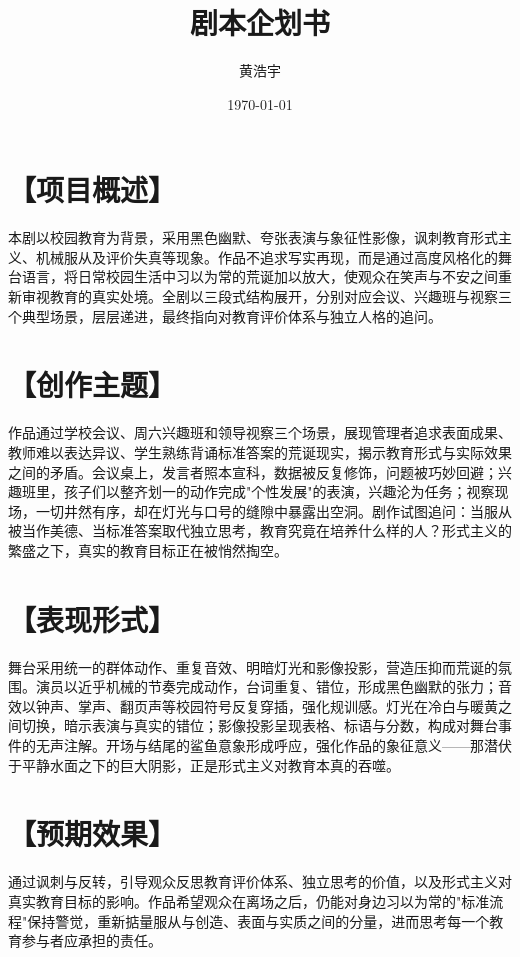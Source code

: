 \documentclass[11pt, a4paper]{article}
\title{剧本企划书}
\author{黄浩宇}
\date{\today}
\begin{document}
	
	\maketitle
	\newpage
	
	\section{【项目概述】}
	
	本剧以校园教育为背景，采用黑色幽默、夸张表演与象征性影像，讽刺教育形式主义、机械服从及评价失真等现象。作品不追求写实再现，而是通过高度风格化的舞台语言，将日常校园生活中习以为常的荒诞加以放大，使观众在笑声与不安之间重新审视教育的真实处境。全剧以三段式结构展开，分别对应会议、兴趣班与视察三个典型场景，层层递进，最终指向对教育评价体系与独立人格的追问。
	
	\section{【创作主题】}
	
	作品通过学校会议、周六兴趣班和领导视察三个场景，展现管理者追求表面成果、教师难以表达异议、学生熟练背诵标准答案的荒诞现实，揭示教育形式与实际效果之间的矛盾。会议桌上，发言者照本宣科，数据被反复修饰，问题被巧妙回避；兴趣班里，孩子们以整齐划一的动作完成"个性发展"的表演，兴趣沦为任务；视察现场，一切井然有序，却在灯光与口号的缝隙中暴露出空洞。剧作试图追问：当服从被当作美德、当标准答案取代独立思考，教育究竟在培养什么样的人？形式主义的繁盛之下，真实的教育目标正在被悄然掏空。
	
	\section{【表现形式】}
	
	舞台采用统一的群体动作、重复音效、明暗灯光和影像投影，营造压抑而荒诞的氛围。演员以近乎机械的节奏完成动作，台词重复、错位，形成黑色幽默的张力；音效以钟声、掌声、翻页声等校园符号反复穿插，强化规训感。灯光在冷白与暖黄之间切换，暗示表演与真实的错位；影像投影呈现表格、标语与分数，构成对舞台事件的无声注解。开场与结尾的鲨鱼意象形成呼应，强化作品的象征意义——那潜伏于平静水面之下的巨大阴影，正是形式主义对教育本真的吞噬。
	
	\section{【预期效果】}
	
	通过讽刺与反转，引导观众反思教育评价体系、独立思考的价值，以及形式主义对真实教育目标的影响。作品希望观众在离场之后，仍能对身边习以为常的"标准流程"保持警觉，重新掂量服从与创造、表面与实质之间的分量，进而思考每一个教育参与者应承担的责任。
	
\end{document}
